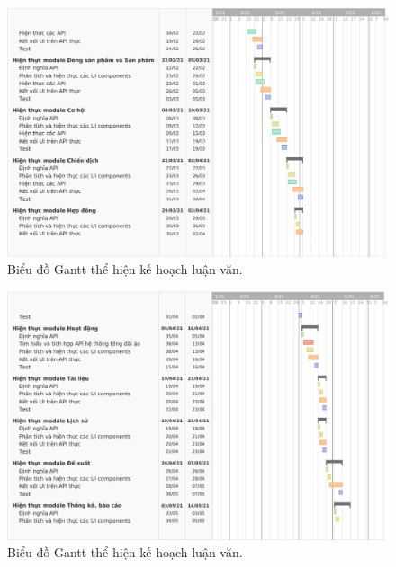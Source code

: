 \documentclass[12pt,a4paper]{article}
\begin{document}
    \begin{figure}
        \includegraphics[width=\textwidth]{Img/KeHoachLV/2.png}
        \caption{Biểu đồ Gantt thể hiện kế hoạch luận văn.}
        \label{fig:Architecture}
    \end{figure}

    \begin{figure}
        \includegraphics[width=\textwidth]{Img/KeHoachLV/3.png}
        \caption{Biểu đồ Gantt thể hiện kế hoạch luận văn.}
        \label{fig:Architecture}
    \end{figure}
\end{document}
